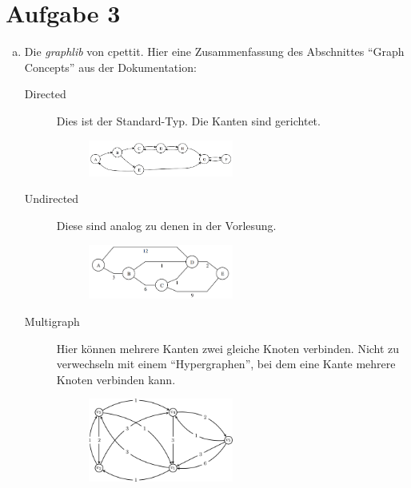 \documentclass[11pt]{article}
\begin{document}
\section*{Aufgabe 3}
\begin{enumerate}[a)]

  \item Die \emph{graphlib} von cpettit. Hier eine Zusammenfassung des
    Abschnittes ``Graph Concepts'' aus der Dokumentation:
    \begin{description}
      \item[Directed] 
        Dies ist der Standard-Typ. Die Kanten sind gerichtet.

        \begin{figure}[h!]
          \centering
          \includegraphics[width=0.5\textwidth]{./tarjan.png}
          \label{fig:}
        \end{figure}

      \item[Undirected]
        Diese sind analog zu denen in der Vorlesung.

        \begin{figure}[h!]
          \centering
          \includegraphics[width=0.5\textwidth]{prim-input.png}
          \label{fig:input}
        \end{figure}

      \item[Multigraph]
        Hier k\"onnen mehrere Kanten zwei gleiche Knoten verbinden. Nicht
        zu verwechseln mit einem ``Hypergraphen'', bei dem eine Kante mehrere
        Knoten verbinden kann.

        \begin{figure}[h!]
          \centering
          \includegraphics[width=0.5\textwidth]{weighted-multigraph.png}
          \label{fig:multigraph}
        \end{figure}


\end{description}
\end{enumerate}
\end{document}
